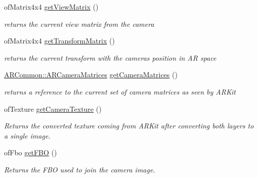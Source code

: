 \begin{DoxyCompactItemize}
of\+Matrix4x4 \hyperlink{class_a_r_core_1_1_a_r_cam_a7ca28300844875464c7821620665d3b5}{get\+View\+Matrix} ()
\begin{DoxyCompactList}\small\item\em returns the current view matrix from the camera \end{DoxyCompactList}\item 
\mbox{\label{class_a_r_core_1_1_a_r_cam_a280c37d6b4aa16169637cf3f5332c9d3}} 
of\+Matrix4x4 \hyperlink{class_a_r_core_1_1_a_r_cam_a280c37d6b4aa16169637cf3f5332c9d3}{get\+Transform\+Matrix} ()
\begin{DoxyCompactList}\small\item\em returns the current transform with the camera\textquotesingle{}s position in AR space \end{DoxyCompactList}\item 
\mbox{\label{class_a_r_core_1_1_a_r_cam_a1398ffe9720425cfbc99635b08bc80d6}} 
\hyperlink{struct_a_r_common_1_1_a_r_camera_matrices}{A\+R\+Common\+::\+A\+R\+Camera\+Matrices} \hyperlink{class_a_r_core_1_1_a_r_cam_a1398ffe9720425cfbc99635b08bc80d6}{get\+Camera\+Matrices} ()
\begin{DoxyCompactList}\small\item\em returns a reference to the current set of camera matrices as seen by A\+R\+Kit \end{DoxyCompactList}\item 
\mbox{\label{class_a_r_core_1_1_a_r_cam_ae816096383bfc8fbcf6b67ab82b3d629}} 
of\+Texture \hyperlink{class_a_r_core_1_1_a_r_cam_ae816096383bfc8fbcf6b67ab82b3d629}{get\+Camera\+Texture} ()
\begin{DoxyCompactList}\small\item\em Returns the converted texture coming from A\+R\+Kit after converting both layers to a single image. \end{DoxyCompactList}\item 
\mbox{\label{class_a_r_core_1_1_a_r_cam_a4c8f3c9b55f5852dc7a8554fe6ac0888}} 
of\+Fbo \hyperlink{class_a_r_core_1_1_a_r_cam_a4c8f3c9b55f5852dc7a8554fe6ac0888}{get\+F\+BO} ()
\begin{DoxyCompactList}\small\item\em Returns the F\+BO used to join the camera image. \end{DoxyCompactList}\end{DoxyCompactItemize}
